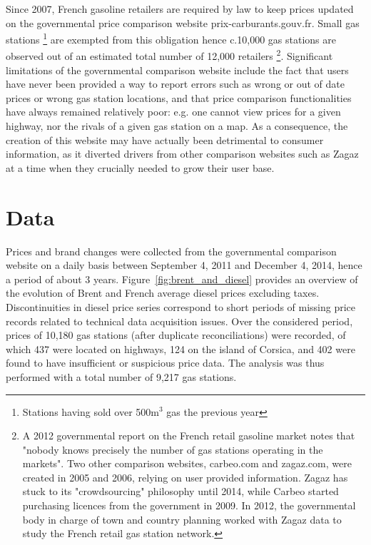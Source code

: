 \documentclass[english]{article}
\begin{document}
Since 2007, French gasoline retailers are required by law to keep prices updated on the governmental price comparison website prix-carburants.gouv.fr. Small gas stations%
\footnote{Stations having sold over 500m$^{3}$ gas the previous year%
} are exempted from this obligation hence c.10,000 gas stations are observed out of an estimated total number of 12,000 retailers%
\footnote{A 2012 governmental report on the French retail gasoline market notes that "nobody knows precisely the number of gas stations operating in the markets". Two other comparison websites, carbeo.com and zagaz.com, were created in 2005 and 2006, relying on user provided information. Zagaz has stuck to its "crowdsourcing" philosophy until 2014, while Carbeo started purchasing licences from the government in 2009. In 2012, the governmental body in charge of town and country planning worked with Zagaz data to study the French retail gas station network.%
}.
Significant limitations of the governmental comparison website include the fact that users have never been provided a way to report errors such as wrong or out of date prices or wrong gas station locations, and that price comparison functionalities have always remained relatively poor: e.g. one cannot view prices for a given highway, nor the rivals of a given gas station on a map. As a consequence, the creation of this website may have actually been detrimental to consumer information, as it diverted drivers from other comparison websites such as Zagaz at a time when they crucially needed to grow their user base.


\section{Data}

Prices and brand changes were collected from the governmental comparison website on a daily basis between September 4, 2011 and December 4, 2014, hence a period of about 3 years. Figure~\ref{fig:brent_and_diesel} provides an overview of the evolution of Brent and French average diesel prices excluding taxes. Discontinuities in diesel price series correspond to short periods of missing price records related to technical data acquisition issues. Over the considered period, prices of 10,180 gas stations (after duplicate reconciliations) were recorded, of which 437 were located on highways, 124 on the island of Corsica, and 402 were found to have insufficient or suspicious price data. The analysis was thus performed with a total number of 9,217 gas stations.
\end{document}
